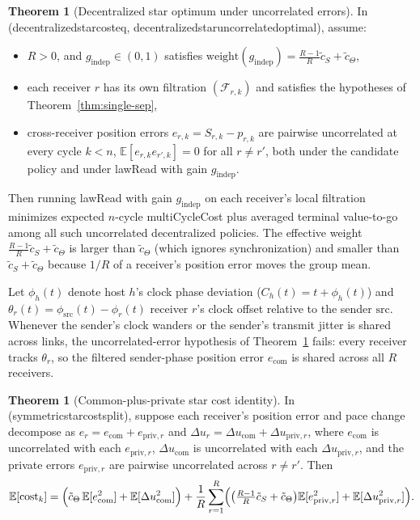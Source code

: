\documentclass[11pt,a4paper]{article}
\DeclareRobustCommand{\lean}[1]{{\ttfamily\def\_{\textunderscore\allowbreak}#1}}
\newcommand{\E}{\mathbb{E}}
\theoremstyle{definition}
\newtheorem{theorem}[definition]{Theorem}
\begin{document}
\begin{theorem}[Decentralized star optimum under uncorrelated errors]
\label{thm:star-weight}
In  (\lean{decentralized\_star\_cost\_eq},
\lean{decentralized\_star\_uncorrelated\_optimal}), assume:
\begin{itemize}
\item $R > 0$, and $g_{\mathrm{indep}} \in (0, 1)$ satisfies
  $\mathrm{weight}(g_{\mathrm{indep}}) = \frac{R-1}{R}\tilde c_S + \tilde c_\Theta$,
\item each receiver $r$ has its own filtration $(\mathcal{F}_{r,k})$ and
  satisfies the hypotheses of Theorem~\ref{thm:single-sep},
\item cross-receiver position errors $e_{r,k} = S_{r,k} - p_{r,k}$ are pairwise
  uncorrelated at every cycle $k < n$, $\E[e_{r,k} e_{r',k}] = 0$ for all
  $r \ne r'$, both under the candidate policy and under \lean{lawRead} with
  gain $g_{\mathrm{indep}}$.
\end{itemize}
Then running \lean{lawRead} with gain $g_{\mathrm{indep}}$ on each receiver's
local filtration minimizes expected $n$-cycle \lean{multiCycleCost} plus
averaged terminal value-to-go among all such uncorrelated decentralized
policies. The effective weight $\frac{R-1}{R}\tilde c_S + \tilde c_\Theta$ is
larger than $\tilde c_\Theta$ (which ignores synchronization) and smaller than
$\tilde c_S + \tilde c_\Theta$ because $1/R$ of a receiver's position error
moves the group mean.
\end{theorem}

Let $\phi_h(t)$ denote host $h$'s clock phase deviation ($C_h(t) = t + \phi_h(t)$)
and $\theta_r(t) = \phi_{\mathrm{src}}(t) - \phi_r(t)$ receiver $r$'s clock
offset relative to the sender $\mathrm{src}$. Whenever the sender's clock
wanders or the sender's transmit jitter is shared across links, the
uncorrelated-error hypothesis of Theorem~\ref{thm:star-weight} fails: every
receiver tracks $\theta_r$, so the filtered sender-phase position error
$e_{\mathrm{com}}$ is shared across all $R$ receivers.

\begin{theorem}[Common-plus-private star cost identity]
\label{thm:star-split}
In  (\lean{symmetric\_star\_cost\_split}), suppose each
receiver's position error and pace change decompose as
$e_r = e_{\mathrm{com}} + e_{\mathrm{priv},r}$ and
$\Delta u_r = \Delta u_{\mathrm{com}} + \Delta u_{\mathrm{priv},r}$, where
$e_{\mathrm{com}}$ is uncorrelated with each $e_{\mathrm{priv},r}$,
$\Delta u_{\mathrm{com}}$ is uncorrelated with each $\Delta u_{\mathrm{priv},r}$,
and the private errors $e_{\mathrm{priv},r}$ are pairwise uncorrelated across
$r \ne r'$. Then
\[
  \E[\mathrm{cost}_k]
  = \Bigl(\tilde c_\Theta\,\E[e_{\mathrm{com}}^2] + \E[\Delta u_{\mathrm{com}}^2]\Bigr)
  + \frac{1}{R}\sum_{r=1}^R
    \Bigl(\bigl(\tfrac{R-1}{R}\tilde c_S + \tilde c_\Theta\bigr)\E[e_{\mathrm{priv},r}^2]
      + \E[\Delta u_{\mathrm{priv},r}^2]\Bigr) .
\]
\end{theorem}
\end{document}
